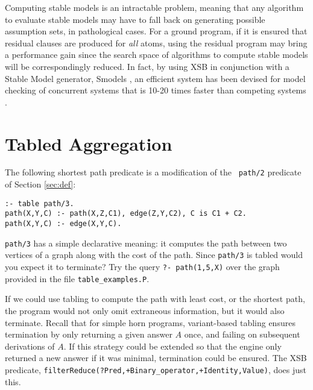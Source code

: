 Computing stable models is an intractable problem, meaning that any
algorithm to evaluate stable models may have to fall back on
generating possible assumption sets, in pathological cases.  For a
ground program, if it is ensured that residual clauses are produced
for {\em all} atoms, using the residual program may bring a
performance gain since the search space of algorithms to compute
stable models will be correspondingly reduced.  In fact, by using XSB
in conjunction with a Stable Model generator, Smodels \cite{NiSi96},
an efficient system has been devised for model checking of concurrent
systems that is 10-20 times faster than competing systems
\cite{LiRS98}.  

\section{Tabled Aggregation} \label{sec:table-aggregation}

The following shortest path predicate is a modification of the {\tt
path/2} predicate of Section \ref{sec:def}:
\begin{center}
\begin{minipage}{3.8in}
\begin{verbatim}
:- table path/3.
path(X,Y,C) :- path(X,Z,C1), edge(Z,Y,C2), C is C1 + C2.
path(X,Y,C) :- edge(X,Y,C).
\end{verbatim}						       
\end{minipage}
\end{center}

\begin{exercise}
{\tt path/3} has a simple declarative meaning: it computes the path
between two vertices of a graph along with the cost of the path.
Since {\tt path/3} is tabled would you expect it to terminate?  Try
the query {\tt ?- path(1,5,X)} over the graph provided in the file
{\tt table\_examples.P}.
\end{exercise}

If we could use tabling to compute the path with least cost, or the
shortest path, the program would not only omit extraneous information,
but it would also terminate.  Recall that for simple horn programs,
variant-based tabling ensures termination by only returning a given
answer $A$ once, and failing on subsequent derivations of $A$.  If
this strategy could be extended so that the engine only returned a new
answer if it was minimal, termination could be ensured.  The XSB
predicate, {\tt filterReduce(?Pred,+Binary\_operator,+Identity,Value)},
does just this.  

